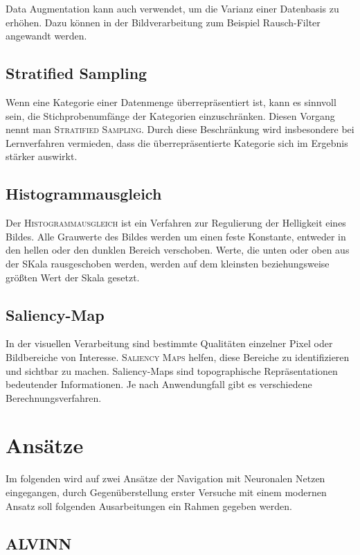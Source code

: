 Data Augmentation kann auch verwendet, um die Varianz einer Datenbasis zu erhöhen. Dazu können in der Bildverarbeitung zum Beispiel Rausch-Filter angewandt werden.

\subsection{Stratified Sampling}
Wenn eine Kategorie einer Datenmenge überrepräsentiert ist, kann es sinnvoll sein, die Stichprobenumfänge der Kategorien einzuschränken. Diesen Vorgang nennt man \textsc{Stratified Sampling}. Durch diese Beschränkung wird insbesondere bei Lernverfahren vermieden, dass die überrepräsentierte Kategorie sich im Ergebnis stärker auswirkt.

\subsection{Histogrammausgleich}
Der \textsc{Histogrammausgleich} ist ein Verfahren zur Regulierung der Helligkeit eines Bildes. Alle Grauwerte des Bildes werden um einen feste Konstante, entweder in den hellen oder den dunklen Bereich verschoben. Werte, die unten oder oben aus der SKala rausgeschoben werden, werden auf dem kleinsten beziehungsweise größten Wert der Skala gesetzt.

\subsection{Saliency-Map}
In der visuellen Verarbeitung sind bestimmte Qualitäten einzelner Pixel oder Bildbereiche von Interesse. \textsc{Saliency Maps} helfen, diese Bereiche zu identifizieren und sichtbar zu machen. Saliency-Maps sind topographische Repräsentationen bedeutender Informationen. Je nach Anwendungfall gibt es verschiedene Berechnungsverfahren.


\section{Ansätze}
Im folgenden wird auf zwei Ansätze der Navigation mit Neuronalen Netzen eingegangen, durch Gegenüberstellung erster Versuche mit einem modernen Ansatz soll folgenden Ausarbeitungen ein Rahmen gegeben werden.

\subsection{ALVINN}

